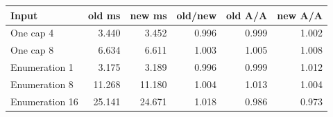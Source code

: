 \begin{center}
\small
\begin{tabular}{lrrrrr}
\toprule
Input & old ms & new ms & old/new & old A/A & new A/A\\
\midrule
One cap 4 & 3.440 & 3.452 & 0.996 & 0.999 & 1.002\\
One cap 8 & 6.634 & 6.611 & 1.003 & 1.005 & 1.008\\
Enumeration 1 & 3.175 & 3.189 & 0.996 & 0.999 & 1.012\\
Enumeration 8 & 11.268 & 11.180 & 1.004 & 1.013 & 1.004\\
Enumeration 16 & 25.141 & 24.671 & 1.018 & 0.986 & 0.973\\
\bottomrule
\end{tabular}
\end{center}
